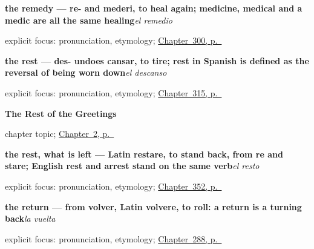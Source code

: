 \noindent\begin{minipage}[t]{\linewidth}
\raggedright
\textbf{the remedy — re- and mederi, to heal again; medicine, medical and a medic are all the same healing}\enspace\emph{el remedio}\par
\footnotesize explicit focus: pronunciation, etymology; \hyperref[ch:el-cuerpo-dice]{Chapter~300, p.~\pageref*{ch:el-cuerpo-dice}}
\end{minipage}\par\smallskip

\noindent\begin{minipage}[t]{\linewidth}
\raggedright
\textbf{the rest — des- undoes cansar, to tire; rest in Spanish is defined as the reversal of being worn down}\enspace\emph{el descanso}\par
\footnotesize explicit focus: pronunciation, etymology; \hyperref[ch:fuerza-y-risa]{Chapter~315, p.~\pageref*{ch:fuerza-y-risa}}
\end{minipage}\par\smallskip

\noindent\begin{minipage}[t]{\linewidth}
\raggedright
\textbf{The Rest of the Greetings}\par
\footnotesize chapter topic; \hyperref[ch:greetings]{Chapter~2, p.~\pageref*{ch:greetings}}
\end{minipage}\par\smallskip

\noindent\begin{minipage}[t]{\linewidth}
\raggedright
\textbf{the rest, what is left — Latin restare, to stand back, from re and stare; English rest and arrest stand on the same verb}\enspace\emph{el resto}\par
\footnotesize explicit focus: pronunciation, etymology; \hyperref[ch:el-conjunto-y-el-resto]{Chapter~352, p.~\pageref*{ch:el-conjunto-y-el-resto}}
\end{minipage}\par\smallskip

\noindent\begin{minipage}[t]{\linewidth}
\raggedright
\textbf{the return — from volver, Latin volvere, to roll: a return is a turning back}\enspace\emph{la vuelta}\par
\footnotesize explicit focus: pronunciation, etymology; \hyperref[ch:la-partida]{Chapter~288, p.~\pageref*{ch:la-partida}}
\end{minipage}\par\smallskip


